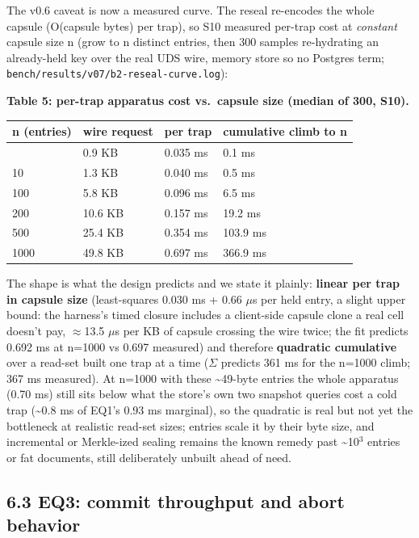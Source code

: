 \documentclass[
  11pt,
]{article}
\newcounter{none} %
\begin{document}
The v0.6 caveat is now a measured curve. The reseal re-encodes the whole capsule (O(capsule bytes) per trap), so S10 measured per-trap cost at \emph{constant} capsule size n (grow to n distinct entries, then 300 samples re-hydrating an already-held key over the real UDS wire, memory store so no Postgres term; \texttt{bench/results/v07/b2-reseal-curve.log}):

\textbf{Table 5: per-trap apparatus cost vs.~capsule size (median of 300, S10).}

{\def\LTcaptype{none} %
\begin{longtable}[]{@{}llll@{}}
\toprule\noalign{}
n (entries) & wire request & per trap & cumulative climb to n \\
\midrule\noalign{}
\endhead
\bottomrule\noalign{}
\endlastfoot
1 & 0.9 KB & 0.035 ms & 0.1 ms \\
10 & 1.3 KB & 0.040 ms & 0.5 ms \\
100 & 5.8 KB & 0.096 ms & 6.5 ms \\
200 & 10.6 KB & 0.157 ms & 19.2 ms \\
500 & 25.4 KB & 0.354 ms & 103.9 ms \\
1000 & 49.8 KB & 0.697 ms & 366.9 ms \\
\end{longtable}
}

The shape is what the design predicts and we state it plainly: \textbf{linear per trap in capsule size} (least-squares 0.030 ms + 0.66 $\mu$s per held entry, a slight upper bound: the harness's timed closure includes a client-side capsule clone a real cell doesn't pay, $\approx$13.5 $\mu$s per KB of capsule crossing the wire twice; the fit predicts 0.692 ms at n=1000 vs 0.697 measured) and therefore \textbf{quadratic cumulative} over a read-set built one trap at a time ($\Sigma$ predicts 361 ms for the n=1000 climb; 367 ms measured). At n=1000 with these \textasciitilde49-byte entries the whole apparatus (0.70 ms) still sits below what the store's own two snapshot queries cost a cold trap (\textasciitilde0.8 ms of EQ1's 0.93 ms marginal), so the quadratic is real but not yet the bottleneck at realistic read-set sizes; entries scale it by their byte size, and incremental or Merkle-ized sealing remains the known remedy past \textasciitilde10$^{3}$ entries or fat documents, still deliberately unbuilt ahead of need.

\subsection{6.3 EQ3: commit throughput and abort behavior}\label{eq3-commit-throughput-and-abort-behavior}
\end{document}
